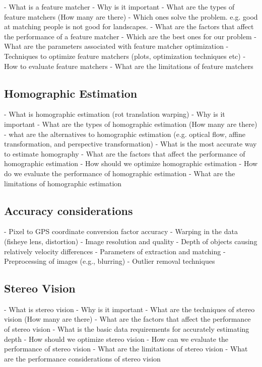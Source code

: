 - What is a feature matcher
- Why is it important
- What are the types of feature matchers (How many are there)
- Which ones solve the problem. e.g. good at matching people is not good for landscapes.
- What are the factors that affect the performance of a feature matcher
- Which are the best ones for our problem
- What are the parameters associated with feature matcher optimization
- Techniques to optimize feature matchers (plots, optimization techniques etc)
- How to evaluate feature matchers
- What are the limitations of feature matchers


\subsection{Homographic Estimation} 
- What is homographic estimation (rot translation warping)
- Why is it important
- What are the types of homographic estimation (How many are there)
- what are the alternatives to homographic estimation (e.g. optical flow, affine transformation, and perspective transformation)
- What is the most accurate way to estimate homography
- What are the factors that affect the performance of homographic estimation    
- How should we optimize homographic estimation
- How do we evaluate the performance of homographic estimation
- What are the limitations of homographic estimation

\subsection*{Accuracy considerations}
- Pixel to GPS coordinate conversion factor accuracy
- Warping in the data (fisheye lens, distortion)
- Image resolution and quality
- Depth of objects causing relatively velocity differences
- Parameters of extraction and matching
- Preprocessing of images (e.g., blurring)
- Outlier removal techniques

\subsection*{Stereo Vision}
- What is stereo vision
- Why is it important
- What are the techniques of stereo vision (How many are there)
- What are the factors that affect the performance of stereo vision
- What is the basic data requirements for accurately estimating depth
- How should we optimize stereo vision
- How can we evaluate the performance of stereo vision
- What are the limitations of stereo vision
- What are the performance considerations of stereo vision

